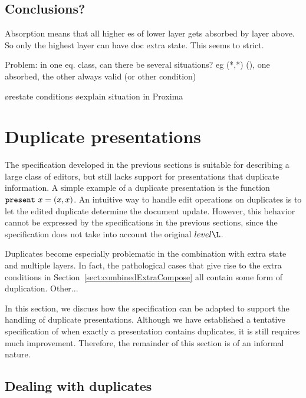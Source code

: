 \subsection{Conclusions?}

Absorption means that all higher es of lower layer gets absorbed by layer above. So only the highest layer can have doc extra state. This seems to strict.

Problem: in one eq. class, can there be several situations? eg (*,*) \dbarr (), one absorbed, the other always valid (or other condition)

\bl
\o restate conditions
\o explain situation in Proxima
\el





\fromHere
%																
%																
%																
\section{Duplicate presentations}

The specification developed in the previous sections is suitable for describing a large class of editors, but still lacks support for presentations that duplicate information. A simple example of a duplicate presentation is the function ${\tt present}~x = (x, x)$. An intuitive way to handle edit operations on duplicates is to let the edited duplicate determine the document update. However, this behavior cannot be expressed by the specifications in the previous sections, since the specification does not take into account the original $level\L$.

Duplicates become especially problematic in the combination with extra state and multiple layers. In fact, the pathological cases that give rise to the extra conditions in Section~\ref{sect:combinedExtraCompose} all contain some form of duplication. Other... 

In this section, we discuss how the specification can be adapted to support the handling of duplicate presentations. Although we have established a tentative specification of when exactly a presentation contains duplicates, it is still requires much improvement. Therefore, the remainder of this section is of an informal nature.


\subsection{Dealing with duplicates}

